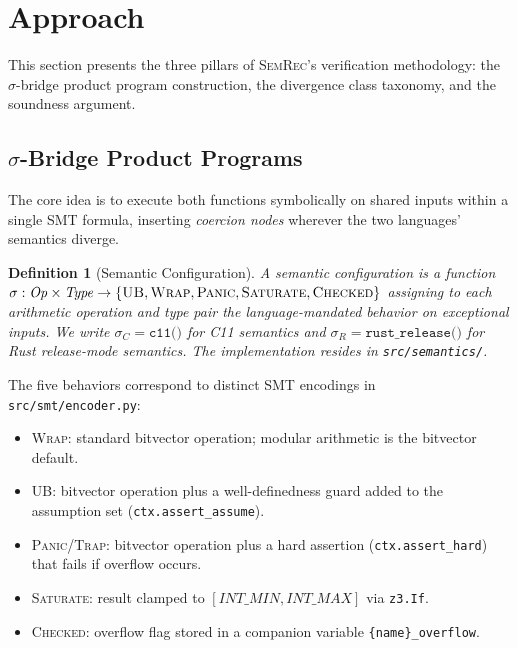 \documentclass[10pt,a4paper]{article}
\newtheorem{definition}[theorem]{Definition}
\begin{document}
\section{Approach}\label{sec:approach}

This section presents the three pillars of \textsc{SemRec}'s
verification methodology: the $\sigma$-bridge product program
construction, the divergence class taxonomy, and the soundness
argument.

\subsection{$\sigma$-Bridge Product Programs}\label{sec:sigma-bridge}

The core idea is to execute both functions symbolically on shared
inputs within a single SMT formula, inserting \emph{coercion nodes}
wherever the two languages' semantics diverge.

\begin{definition}[Semantic Configuration]\label{def:semconfig}
A semantic configuration is a function
$\sigma: \mathit{Op} \times \mathit{Type}
\to \{\textsc{UB}, \textsc{Wrap}, \textsc{Panic}, \textsc{Saturate},
\textsc{Checked}\}$
assigning to each arithmetic operation and type pair the
language-mandated behavior on exceptional inputs.  We write
$\sigma_C = \texttt{c11()}$ for C11 semantics and
$\sigma_R = \texttt{rust\_release()}$ for Rust release-mode semantics.
The implementation resides in \texttt{src/semantics/}.
\end{definition}

The five behaviors correspond to distinct SMT encodings in
\texttt{src/smt/encoder.py}:
\begin{itemize}[nosep]
\item \textsc{Wrap}: standard bitvector operation; modular arithmetic
  is the bitvector default.
\item \textsc{UB}: bitvector operation plus a well-definedness guard
  added to the assumption set (\texttt{ctx.assert\_assume}).
\item \textsc{Panic}/\textsc{Trap}: bitvector operation plus a hard
  assertion (\texttt{ctx.assert\_hard}) that fails if overflow occurs.
\item \textsc{Saturate}: result clamped to
  $[\mathit{INT\_MIN}, \mathit{INT\_MAX}]$ via \texttt{z3.If}.
\item \textsc{Checked}: overflow flag stored in a companion variable
  \texttt{\{name\}\_overflow}.
\end{itemize}
\end{document}

